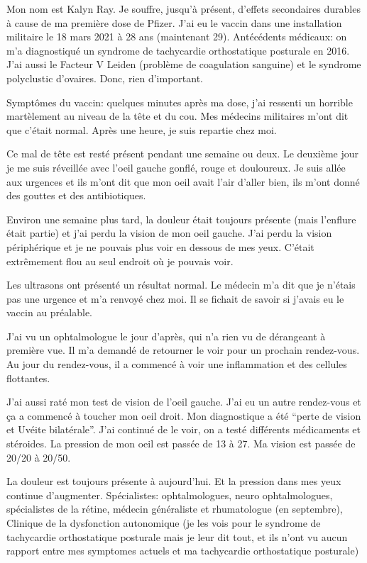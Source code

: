 \normalsize

Mon nom est Kalyn Ray. Je souffre, jusqu'à présent, d'effets secondaires
durables à cause de ma première dose de Pfizer. J'ai eu le vaccin dans une
installation militaire le 18 mars 2021 à 28 ans (maintenant 29).  Antécédents
médicaux: on m'a diagnostiqué un syndrome de tachycardie orthostatique posturale
en 2016. J'ai aussi le Facteur V Leiden (problème de coagulation sanguine) et le
syndrome polyclustic d'ovaires. Donc, rien d'important.

Symptômes du vaccin: quelques minutes après ma dose, j'ai ressenti un horrible
martèlement au niveau de la tête et du cou. Mes médecins militaires m'ont dit
que c'était normal. Après une heure, je suis repartie chez moi.

Ce mal de tête est resté présent pendant une semaine ou deux. Le deuxième jour
je me suis réveillée avec l'oeil gauche gonflé, rouge et douloureux. Je suis
allée aux urgences et ils m'ont dit que mon oeil avait l'air d'aller bien, ils
m'ont donné des gouttes et des antibiotiques.

Environ une semaine plus tard, la douleur était toujours présente (mais
l'enflure était partie) et j'ai perdu la vision de mon oeil gauche. J'ai perdu
la vision périphérique et je ne pouvais plus voir en dessous de mes
yeux. C'était extrêmement flou au seul endroit où je pouvais voir.

Les ultrasons ont présenté un résultat normal. Le médecin m'a dit que je n'étais
pas une urgence et m'a renvoyé chez moi. Il se fichait de savoir si j'avais eu
le vaccin au préalable.

J'ai vu un ophtalmologue le jour d'après, qui n'a rien vu de dérangeant à
première vue. Il m'a demandé de retourner le voir pour un prochain
rendez-vous. Au jour du rendez-vous, il a commencé à voir une inflammation et
des cellules flottantes.

J'ai aussi raté mon test de vision de l'oeil gauche. J'ai eu un autre
rendez-vous et ça a commencé à toucher mon oeil droit. Mon diagnostique a été
“perte de vision et Uvéite bilatérale”. J'ai continué de le voir, on a testé
différents médicaments et stéroides. La pression de mon oeil est passée de 13 à
27. Ma vision est passée de 20/20 à 20/50.

La douleur est toujours présente à aujourd'hui. Et la pression dans mes yeux
continue d'augmenter. Spécialistes: ophtalmologues, neuro ophtalmologues,
spécialistes de la rétine, médecin généraliste et rhumatologue (en septembre),
Clinique de la dysfonction autonomique (je les vois pour le syndrome de
tachycardie orthostatique posturale mais je leur dit tout, et ils n'ont vu aucun
rapport entre mes symptomes actuels et ma tachycardie orthostatique posturale)

